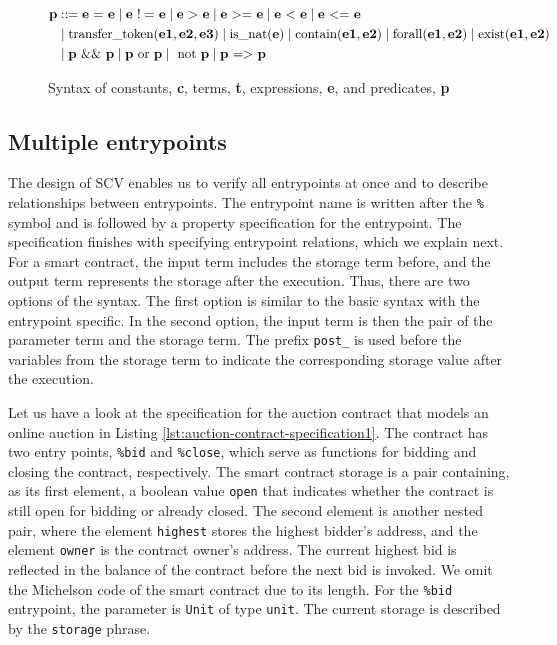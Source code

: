 \documentclass[runningheads]{llncs}
\begin{document}
\begin{figure}[tp]
\begin{align*}
\textbf{p} & :: = \textbf{e} \text{ = } \textbf{e}
\mid \textbf{e} \text{ $!=$ } \textbf{e}
\mid \textbf{e} \text{ $>$ } \textbf{e}
\mid \textbf{e} \text{ $>=$ } \textbf{e}
\mid \textbf{e} \text{ $<$ } \textbf{e}
\mid \textbf{e} \text{ $<=$ } \textbf{e} \\
& \mid \text{transfer\_token} (\textbf{e1}, \textbf{e2}, \textbf{e3})  
 \mid \text{is\_nat} (\textbf{e})  
 \mid \text{contain} (\textbf{e1}, \textbf{e2}) 
 \mid \text{forall} (\textbf{e1}, \textbf{e2})
\mid \text{exist} (\textbf{e1}, \textbf{e2}) \\
& \mid \textbf{p} \text{ \&\& } \textbf{p}\mid \textbf{p} \text{ or } \textbf{p}  
\mid  \text{ not } \textbf{p} \mid \textbf{p} \text{ $=>$ } \textbf{p} \\
\end{align*}
\caption{Syntax of constants, \textbf{c}, terms, \textbf{t}, expressions, \textbf{e}, and predicates, \textbf{p}}
\label{fig:syntax-terms-predicates}
\end{figure}
\subsection{Multiple entrypoints}
\label{sec:multiple-entrypoint}
The design of SCV enables us to verify all entrypoints
at once and to describe relationships between entrypoints. The entrypoint name is written after the \lstinline/%/ symbol and is followed by a property specification for the entrypoint.  The specification finishes with specifying entrypoint relations, which we explain next. For a smart contract, the input term includes the storage term before, and the output term represents the storage after the execution. Thus, there are two options of the syntax. The first option is similar to the basic syntax with the entrypoint specific.  
In the second option, the input term is then the pair of the parameter term and the storage term. The prefix \lstinline/post_/ is used before the variables from the storage term to indicate the corresponding storage value after the execution.

Let us have a look at the specification for the auction
contract that models an online auction in Listing \ref{lst:auction-contract-specification1}. The contract has two entry points, \lstinline|%bid| and \lstinline|%close|, which serve as functions for bidding and closing the contract, respectively. The smart contract storage is a pair containing, as its first element, a boolean value \lstinline|open| that indicates whether the contract is still open for bidding or already closed. The second element is another nested pair, where the element \lstinline|highest| stores the highest bidder's address, and the element \lstinline|owner| is the contract owner's address. The current highest bid is reflected in the balance of the contract before the next bid is invoked. We omit the Michelson code of the smart contract due to its length.  For the \lstinline/%bid/ entrypoint, the parameter is \lstinline/Unit/ of type \lstinline/unit/.
The current storage is described by the \lstinline|storage| phrase. 
\end{document}
